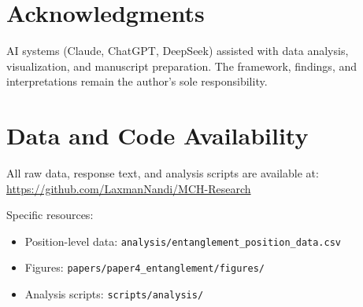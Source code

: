 \documentclass[twoside,11pt]{article}
\begin{document}
\section*{Acknowledgments}

AI systems (Claude, ChatGPT, DeepSeek) assisted with data analysis, visualization, and manuscript preparation. The framework, findings, and interpretations remain the author's sole responsibility.

\section*{Data and Code Availability}

All raw data, response text, and analysis scripts are available at: \url{https://github.com/LaxmanNandi/MCH-Research}

Specific resources:
\begin{itemize}
    \item Position-level data: \texttt{analysis/entanglement\_position\_data.csv}
    \item Figures: \texttt{papers/paper4\_entanglement/figures/}
    \item Analysis scripts: \texttt{scripts/analysis/}
\end{itemize}


\end{document}
